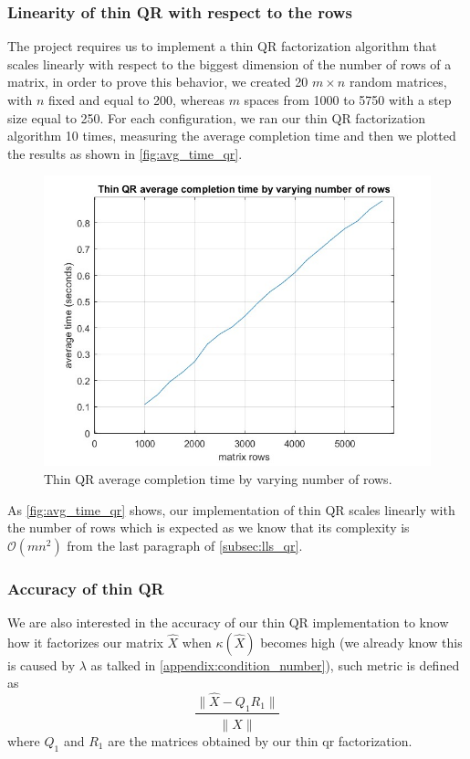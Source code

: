 \subsubsection{Linearity of thin QR with respect to the rows}\label{subsec:qr_linearity}
The project requires us to implement a thin QR factorization algorithm that scales linearly with respect to the biggest dimension of the number of rows of a matrix, in order to prove this behavior, we created 20 $m \times n$ random matrices, with $n$ fixed and equal to 200, whereas $m$ spaces from 1000 to 5750 with a step size equal to 250. For each configuration, we ran our thin QR factorization algorithm 10 times, measuring the average completion time and then we plotted the results as shown in \autoref{fig:avg_time_qr}.
\begin{figure}[H]
    \centering
    \includegraphics[width = 0.8\linewidth]{images/thin_qr/avg_time_qr.jpg}
    \caption{Thin QR average completion time by varying number of rows.}
    \label{fig:avg_time_qr}
\end{figure}

\noindent As \autoref{fig:avg_time_qr} shows, our implementation of thin QR scales linearly with the number of rows which is expected as we know that its complexity is $\mathcal{O}(mn^2)$ from the last paragraph of \ref{subsec:lls_qr}.

\subsubsection{Accuracy of thin QR}
We are also interested in the accuracy of our thin QR implementation to know how it factorizes our matrix $\hat{X}$ when $\kappa(\hat{X})$ becomes high (we already know this is caused by $\lambda$ as talked in \ref{appendix:condition_number}), such metric is defined as
\begin{equation}
    \frac{\lVert \hat{X} - Q_1R_1\rVert}{\lVert \hat{X}\rVert}
    \label{eq:thin_qr_accuracy}
\end{equation}
where $Q_1$ and $R_1$ are the matrices obtained by our thin qr factorization.
\vspace{3mm}

